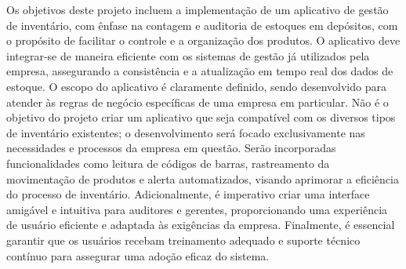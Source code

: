
Os objetivos deste projeto incluem a implementação de um aplicativo de gestão de inventário, com ênfase na contagem e auditoria de estoques em depósitos, com o propósito de facilitar o controle e a organização dos produtos. O aplicativo deve integrar-se de maneira eficiente com os sistemas de gestão já utilizados pela empresa, assegurando a consistência e a atualização em tempo real dos dados de estoque.
O escopo do aplicativo é claramente definido, sendo desenvolvido para atender às regras de negócio específicas de uma empresa em particular. Não é o objetivo do projeto criar um aplicativo que seja compatível com os diversos tipos de inventário existentes; o desenvolvimento será focado exclusivamente nas necessidades e processos da empresa em questão.
Serão incorporadas funcionalidades como leitura de códigos de barras, rastreamento da movimentação de produtos e alerta automatizados, visando aprimorar a eficiência do processo de inventário. Adicionalmente, é imperativo criar uma interface amigável e intuitiva para auditores e gerentes, proporcionando uma experiência de usuário eficiente e adaptada às exigências da empresa.
Finalmente, é essencial garantir que os usuários recebam treinamento adequado e suporte técnico contínuo para assegurar uma adoção eficaz do sistema.
